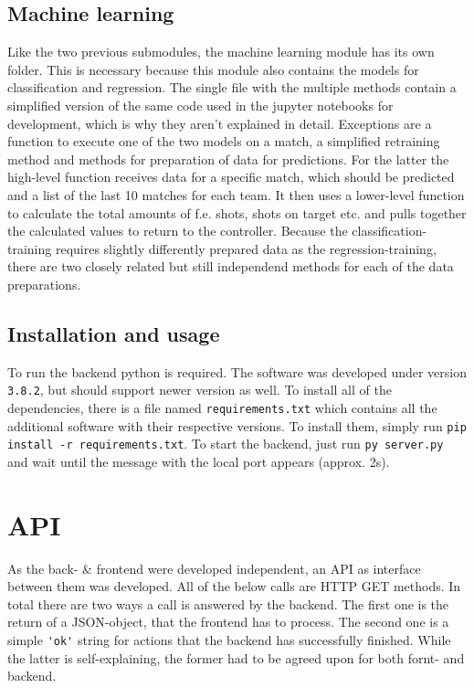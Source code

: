 \subsection{Machine learning}
Like the two previous submodules, the machine learning module has its own folder. This is necessary because this module also contains the models for classification and regression. The single file with the multiple methods contain a simplified version of the same code used in the jupyter notebooks for development, which is why they aren't explained in detail. Exceptions are a function to execute one of the two models on a match, a simplified retraining method and methods for preparation of data for predictions. For the latter the high-level function receives data for a specific match, which should be predicted and a list of the last 10 matches for each team. It then uses a lower-level function to calculate the total amounts of f.e. shots, shots on target etc. and pulls together the calculated values to return to the controller. Because the classification-training requires slightly differently prepared data as the regression-training, there are two closely related but still independend methods for each of the data preparations.

\subsection{Installation and usage}
To run the backend python is required. The software was developed under version \lstinline[columns=fixed]{3.8.2}, but should support newer version as well. To install all of the dependencies, there is a file named \lstinline[columns=fixed]{requirements.txt} which contains all the additional software with their respective versions. To install them, simply run \lstinline[columns=fixed]{pip install -r requirements.txt}. To start the backend, just run \lstinline[columns=fixed]{py server.py} and wait until the message with the local port appears (approx. 2s).


\section{API}
As the back- \& frontend were developed independent, an API as interface between them was developed. All of the below calls are HTTP GET methods.
\newline
\newline
In total there are two ways a call is answered by the backend. The first one is the return of a JSON-object, that the frontend has to process. The second one is a simple \lstinline[columns=fixed]{'ok'} string for actions that the backend has successfully finished. While the latter is self-explaining, the former had to be agreed upon for both fornt- and backend.

